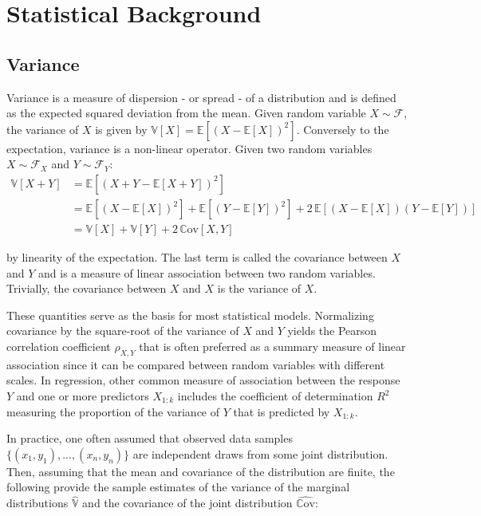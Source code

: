 \documentclass[11pt,a4paper,twoside,openright]{report}
\theoremstyle{definition}
\begin{document}
\chapter{Statistical Background}\label{statistical-background}

\section{Variance}\label{variance}

Variance is a measure of dispersion - or spread - of a distribution and is defined as the expected squared deviation from the mean. Given random variable \(X \sim \mathcal{F}\), the variance of \(X\) is given by \(\mathbb{V}[X] = \mathbb{E}\left[ (X-\mathbb{E}[X])^2 \right]\). Conversely to the expectation, variance is a non-linear operator. Given two random variables \(X \sim \mathcal{F}_X\) and \(Y \sim \mathcal{F}_Y\):
\begin{equation}
\begin{aligned}
\mathbb{V}[X+Y] & = \mathbb{E}\left[ (X+Y - \mathbb{E}[X+Y])^2\right] \\
& = \mathbb{E} \left[ (X - \mathbb{E}[X])^2\right] + \mathbb{E} \left[ (Y - \mathbb{E}[Y])^2\right] + 2 \, \mathbb{E}\left[ (X - \mathbb{E}[X])(Y-\mathbb{E}[Y]) \right] \\
& = \mathbb{V}[X] + \mathbb{V}[Y] + 2 \, \mathbb{C}\text{ov}[X,Y]
\end{aligned}
\label{eq:vardef}
\end{equation}

by linearity of the expectation. The last term is called the covariance between \(X\) and \(Y\) and is a measure of linear association between two random variables. Trivially, the covariance between \(X\) and \(X\) is the variance of \(X\).

These quantities serve as the basis for most statistical models. Normalizing covariance by the square-root of the variance of \(X\) and \(Y\) yields the Pearson correlation coefficient \(\rho_{X,Y}\) that is often preferred as a summary measure of linear association since it can be compared between random variables with different scales. In regression, other common measure of association between the response \(Y\) and one or more predictors \(X_{1:k}\) includes the coefficient of determination \(R^2\) measuring the proportion of the variance of \(Y\) that is predicted by \(X_{1:k}\).

In practice, one often assumed that observed data samples \(\{(x_{1},y_{1}),...,(x_n,y_n)\}\) are independent draws from some joint distribution. Then, assuming that the mean and covariance of the distribution are finite, the following provide the sample estimates of the variance of the marginal distributions \(\hat{\mathbb{V}}\) and the covariance of the joint distribution \(\hat{\mathbb{C}\text{ov}}\):
\end{document}

